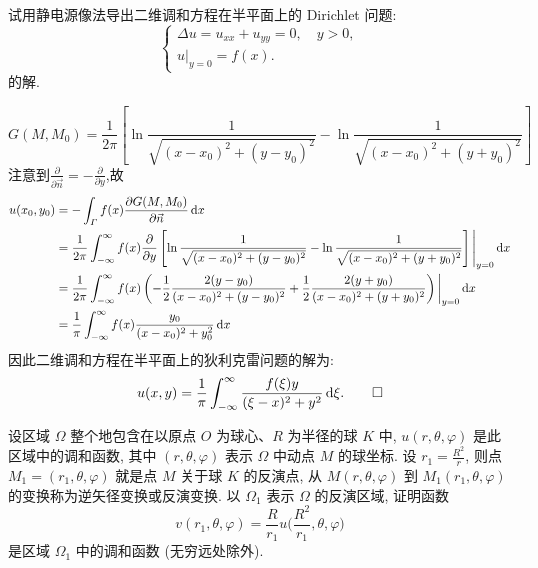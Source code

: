 \begin{exercise}
  试用静电源像法导出二维调和方程在半平面上的 Dirichlet 问题:
  \[\begin{cases}
    \Delta u = u_{xx} + u_{yy} = 0, \quad y>0, \\
    u|_{y=0} = f(x).
  \end{cases}\]
  的解.
\end{exercise}

\begin{solve}
  \[G(M,M_0)=\frac{1}{2\pi}\left[\ln\frac{1}{\sqrt{(x-x_0)^2+(y-y_0)^2}}-\ln\frac{1}{\sqrt{(x-x_0)^2+(y+y_0)^2}}\right]\]
  注意到$\frac{\partial}{\partial\vec{n}}=-\frac{\partial}{\partial y}$,故
  \[\begin{split}
  u(x_0,y_0)&=-\int_{\varGamma}f(x)\frac{\partial G(M,M_0)}{\partial\vec{n}}\mathop{}\!\mathrm{d} x\\
  &=\frac{1}{2\pi}\int_{-\infty}^{\infty}f(x)\frac{\partial}{\partial y}\left[\ln\frac{1}{\sqrt{(x-x_0)^2+(y-y_0)^2}}-\ln\frac{1}{\sqrt{(x-x_0)^2+(y+y_0)^2}}\right]\Bigg|_{y=0}\mathop{}\!\mathrm{d} x\\
  &=\frac{1}{2\pi}\int_{-\infty}^{\infty}f(x)\left(-\frac{1}{2}\frac{2(y-y_0)}{(x-x_0)^2+(y-y_0)^2}+\frac{1}{2}\frac{2(y+y_0)}{(x-x_0)^2+(y+y_0)^2}\right)\bigg|_{y=0}\mathop{}\!\mathrm{d} x\\
  &=\frac{1}{\pi}\int_{-\infty}^{\infty}f(x)\frac{y_0}{(x-x_0)^2+y_0^2}\mathop{}\!\mathrm{d} x
  \end{split}\]
  因此二维调和方程在半平面上的狄利克雷问题的解为:
  \[u(x,y)=\frac{1}{\pi}\int_{-\infty}^{\infty}\frac{f(\xi)y}{(\xi-x)^2+y^2}\mathop{}\!\mathrm{d}\xi. \qedhere\]
\end{solve}


\begin{exercise}
  设区域 $\varOmega$ 整个地包含在以原点 $O$ 为球心、$R$ 为半径的球 $K$ 中,
  $u(r,\theta,\varphi)$ 是此区域中的调和函数, 其中 $(r,\theta,\varphi)$
  表示 $\varOmega$ 中动点 $M$ 的球坐标. 设 $r_1=\frac{R^2}{r}$, 则点
  $M_1=(r_1,\theta,\varphi)$ 就是点 $M$ 关于球 $K$ 的反演点, 从 $M(r,\theta,\varphi)$
  到 $M_1(r_1,\theta,\varphi)$ 的变换称为逆矢径变换或反演变换. 以 $\varOmega_1$
  表示 $\varOmega$ 的反演区域, 证明函数
  \[ v(r_1,\theta,\varphi) = \frac{R}{r_1} u\biggl(\frac{R^2}{r_1},\theta,\varphi\biggr)\]
  是区域 $\varOmega_1$ 中的调和函数 (无穷远处除外).
\end{exercise}

